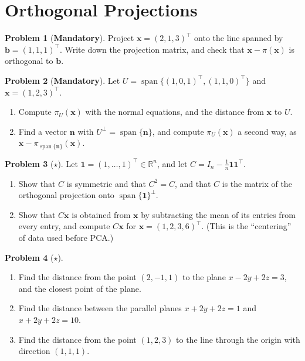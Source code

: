 \documentclass[11pt]{article}
\theoremstyle{definition}
\newtheorem{problem}{Problem}[section]
\newcommand{\mandatory}{\textcolor{red!70!black}{\textbf{Mandatory}}}
\DeclareMathOperator{\Span}{span}
\begin{document}
\section{Orthogonal Projections}

\begin{problem}[\mandatory]\label{pr:proj-line}
    Project $\mathbf{x} = (2, 1, 3)^\top$ onto the line spanned by $\mathbf{b} = (1, 1, 1)^\top$. Write down the projection matrix, and check that $\mathbf{x} - \pi(\mathbf{x})$ is orthogonal to $\mathbf{b}$.
\end{problem}

\begin{problem}[\mandatory]\label{pr:proj-plane}
    Let $U = \Span\{(1, 0, 1)^\top, (1, 1, 0)^\top\}$ and $\mathbf{x} = (1, 2, 3)^\top$.
    \begin{enumerate}[label=(\alph*)]
        \item Compute $\pi_U(\mathbf{x})$ with the normal equations, and the distance from $\mathbf{x}$ to $U$.
        \item Find a vector $\mathbf{n}$ with $U^\perp = \Span\{\mathbf{n}\}$, and compute $\pi_U(\mathbf{x})$ a second way, as $\mathbf{x} - \pi_{\Span\{\mathbf{n}\}}(\mathbf{x})$.
    \end{enumerate}
\end{problem}

\begin{problem}[$\star$]\label{pr:centering}
    Let $\mathbf{1} = (1, \ldots, 1)^\top \in \mathbb{R}^n$, and let $C = I_n - \frac{1}{n}\mathbf{1}\mathbf{1}^\top$.
    \begin{enumerate}[label=(\alph*)]
        \item Show that $C$ is symmetric and that $C^2 = C$, and that $C$ is the matrix of the orthogonal projection onto $\Span\{\mathbf{1}\}^\perp$.
        \item Show that $C\mathbf{x}$ is obtained from $\mathbf{x}$ by subtracting the mean of its entries from every entry, and compute $C\mathbf{x}$ for $\mathbf{x} = (1, 2, 3, 6)^\top$. (This is the ``centering'' of data used before PCA.)
    \end{enumerate}
\end{problem}

\begin{problem}[$\star$]\label{pr:distances}
    \begin{enumerate}[label=(\alph*)]
        \item Find the distance from the point $(2, -1, 1)$ to the plane $x - 2y + 2z = 3$, and the closest point of the plane.
        \item Find the distance between the parallel planes $x + 2y + 2z = 1$ and $x + 2y + 2z = 10$.
        \item Find the distance from the point $(1, 2, 3)$ to the line through the origin with direction $(1, 1, 1)$.
    \end{enumerate}
\end{problem}
\end{document}
